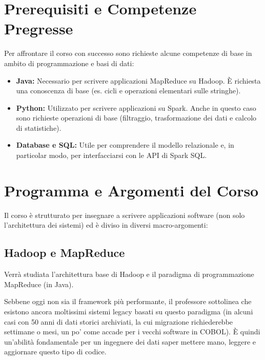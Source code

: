 \section*{Prerequisiti e Competenze Pregresse}
Per affrontare il corso con successo sono richieste alcune competenze di base in ambito di programmazione e basi di dati:
\begin{itemize}
    \item \textbf{Java:} Necessario per scrivere applicazioni MapReduce su Hadoop. È richiesta una conoscenza di base (es. cicli e operazioni elementari sulle stringhe).
    \item \textbf{Python:} Utilizzato per scrivere applicazioni su Spark. Anche in questo caso sono richieste operazioni di base (filtraggio, trasformazione dei dati e calcolo di statistiche).
    \item \textbf{Database e SQL:} Utile per comprendere il modello relazionale e, in particolar modo, per interfacciarsi con le API di Spark SQL.
\end{itemize}

\section*{Programma e Argomenti del Corso}
Il corso è strutturato per insegnare a scrivere applicazioni software (non solo l'architettura dei sistemi) ed è diviso in diversi macro-argomenti:

\subsection*{Hadoop e MapReduce}
Verrà studiata l'architettura base di Hadoop e il paradigma di programmazione MapReduce (in Java). 

\begin{remark}
Sebbene oggi non sia il framework più performante, il professore sottolinea che esistono ancora moltissimi sistemi legacy basati su questo paradigma (in alcuni casi con 50 anni di dati storici archiviati, la cui migrazione richiederebbe settimane o mesi, un po' come accade per i vecchi software in COBOL). È quindi un'abilità fondamentale per un ingegnere dei dati saper mettere mano, leggere e aggiornare questo tipo di codice.
\end{remark}

